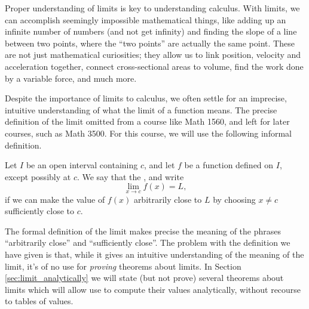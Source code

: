 \enlargethispage{\baselineskip}

Proper understanding of limits is key to understanding calculus. With limits, we can accomplish seemingly impossible mathematical things, like adding up an infinite number of numbers (and not get infinity) and finding the slope of a line between two points, where the ``two points'' are actually the same point. These are not just mathematical curiosities; they allow us to link position, velocity and acceleration together, connect cross-sectional areas to volume, find the work done by a variable force, and much more.


Despite the importance of limits to calculus, we often settle for an imprecise, intuitive understanding of what the limit of a function means. The precise definition of the limit omitted from a course like Math 1560, and left for later courses, such as Math 3500. For this course, we will use the following informal definition.

\smallskip

{

\indent Let $I$ be an open interval containing $c$, and let $f$ be a function defined on $I$, except possibly at $c$. 
We say that the , and write 
\[
\lim_{x\rightarrow c} f(x) = L,
\]
if we can make the value of $f(x)$ arbitrarily close to $L$ by choosing $x\neq c$ sufficiently close to $c$.}


The formal definition of the limit makes precise the meaning of the phrases ``arbitrarily close'' and ``sufficiently close''. The problem with the definition we have given is that, while it gives an intuitive understanding of the meaning of the limit, it's of no use for \textit{proving} theorems about limits. In Section \ref{sec:limit_analytically} we will state (but not prove) several theorems about limits which will allow use to compute their values analytically, without recourse to tables of values.

